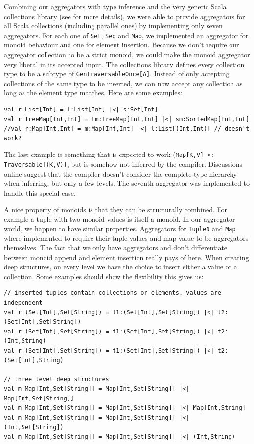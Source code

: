 \documentclass[10pt,a4paper]{article}
\begin{document}
Combining our aggregators with type inference and the very generic Scala collections library (see \citep{odersky2009fighting} for more details), we were able to provide aggregators for all Scala collections (including parallel ones) by implementing only seven aggregators. For each one of \lstinline|Set|, \lstinline|Seq| and \lstinline|Map|, we implemented an aggregator for monoid behaviour and one for element insertion. Because we don't require our aggregator collection to be a strict monoid, we could make the monoid aggregator very liberal in its accepted input. The collections library defines every collection type to be a subtype of \lstinline|GenTraversableOnce[A]|. Instead of only accepting collections of the same type to be inserted, we can now accept any collection as long as the element type matches. Here are some examples:
\begin{lstlisting}
val r:List[Int] = l:List[Int] |<| s:Set[Int]
val r:TreeMap[Int,Int] = tm:TreeMap[Int,Int] |<| sm:SortedMap[Int,Int]
//val r:Map[Int,Int] = m:Map[Int,Int] |<| l:List[(Int,Int)] // doesn't work?
\end{lstlisting}
The last example is something that is expected to work (\lstinline|Map[K,V] <: Traversable[(K,V)]|, but is somehow not inferred by the compiler. Discussions online suggest that the compiler doesn't consider the complete type hierarchy when inferring, but only a few levels. The seventh aggregator was implemented to handle this special case.

A nice property of monoids is that they can be structurally combined. For example a tuple with two monoid values is itself a monoid. In our aggregator world, we happen to have similar properties. Aggregators for \lstinline|TupleN| and \lstinline|Map| where implemented to require their tuple values and map value to be aggregators themselves. The fact that we only have aggregators and don't differentiate between monoid append and element insertion really pays of here. When creating deep structures, on every level we have the choice to insert either a value or a collection. Some examples should show the flexibility this gives us:
\begin{lstlisting}
// inserted tuples contain collections or elements. values are independent
val r:(Set[Int],Set[String]) = t1:(Set[Int],Set[String]) |<| t2:(Set[Int],Set[String])
val r:(Set[Int],Set[String]) = t1:(Set[Int],Set[String]) |<| t2:(Int,String)
val r:(Set[Int],Set[String]) = t1:(Set[Int],Set[String]) |<| t2:(Set[Int],String)

// three level deep structures
val m:Map[Int,Set[String]] = Map[Int,Set[String]] |<| Map[Int,Set[String]]
val m:Map[Int,Set[String]] = Map[Int,Set[String]] |<| Map[Int,String]
val m:Map[Int,Set[String]] = Map[Int,Set[String]] |<| (Int,Set[String])
val m:Map[Int,Set[String]] = Map[Int,Set[String]] |<| (Int,String)
\end{lstlisting}
\end{document}
